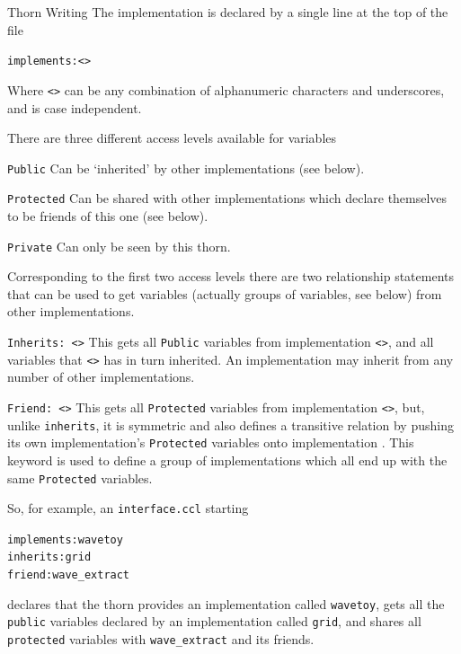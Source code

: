 \begin{cactuspart}{Thorn Writing}
The implementation is declared by a single line at the top of the file
\begin{alltt}
implements: <>
\end{alltt}
Where \texttt{<>} can be any combination of alphanumeric
characters and underscores, and is case independent.

There are three different access levels available for variables

\begin{Lentry}
\item[\texttt{Public}]
Can be `inherited' by other implementations (see below).
\item[\texttt{Protected}]
Can be shared with other implementations which declare themselves to
be friends of this one (see below).
\item[\texttt{Private}]
Can only be seen by this thorn.
\end{Lentry}

Corresponding to the first two access levels there are two relationship
statements that can be used to get variables (actually groups of variables,
see below) from other implementations.

\begin{Lentry}
\item [\texttt{Inherits: <\var{name}>}]
This gets all \texttt{Public} variables from implementation \texttt{<>}, and all
variables that \texttt{<>} has in turn inherited.
An implementation may inherit from any number of other implementations.
\item [\texttt{Friend: <\var{name}>}]
This gets all \texttt{Protected} variables from implementation \texttt{<>}, but,
unlike \texttt{inherits}, it is symmetric and also defines a transitive relation by
pushing its own implementation's \texttt{Protected} variables onto implementation
.  This keyword is used to define a group of implementations which
all end up with the same \texttt{Protected} variables.
\end{Lentry}

So, for example, an \texttt{interface.ccl} starting
\begin{alltt}
implements: wavetoy
inherits:   grid
friend:     wave_extract
\end{alltt}
declares that the thorn provides an implementation called \texttt{wavetoy}, gets
all the \texttt{public} variables declared by an implementation called \texttt{grid},
and shares all \texttt{protected} variables with \texttt{wave\_extract} and its
friends.


\end{cactuspart}
